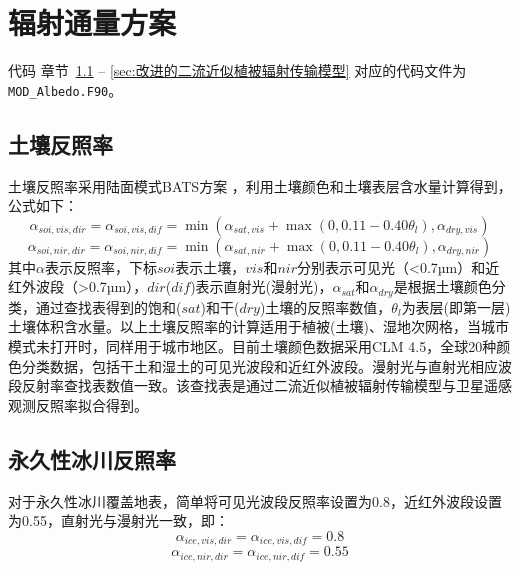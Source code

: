 \chapter{辐射通量方案}

\begin{mymdframed}{代码}
章节~\ref{sec:土壤反照率} -- \ref{sec:改进的二流近似植被辐射传输模型} 对应的代码文件为\texttt{MOD\_Albedo.F90}。
\end{mymdframed}


\section{土壤反照率}\label{sec:土壤反照率}
土壤反照率采用陆面模式BATS方案 \citep{dickinson1986biosphere,dickinson1993biosphere}，利用土壤颜色和土壤表层含水量计算得到，公式如下：
\begin{equation}\label{eq:soil_albedo1}
\alpha_{soi,vis,dir}=\alpha_{soi,vis,dif}=\min\left(\alpha_{sat, vis}+\max\left(0,0.11-0.40 \theta_{l}\right), \alpha_{dry, vis}\right)
\end{equation}
%
\begin{equation}
\alpha_{soi,nir,dir}=\alpha_{soi,nir,dif}=\min\left(\alpha_{sat, nir}+\max\left(0,0.11-0.40 \theta_{l}\right), \alpha_{dry, nir}\right)
\end{equation}
其中$\alpha$表示反照率，下标$soi$表示土壤，$vis$和$nir$分别表示可见光（<0.7µm）和近红外波段（>0.7µm），$dir$($dif$)表示直射光(漫射光)，$\alpha_{sat}$和$\alpha_{dry}$是根据土壤颜色分类，通过查找表得到的饱和($sat$)和干($dry$)土壤的反照率数值，$\theta_{l}$为表层(即第一层)土壤体积含水量。以上土壤反照率的计算适用于植被(土壤)、湿地次网格，当城市模式未打开时，同样用于城市地区。目前土壤颜色数据采用CLM 4.5，全球20种颜色分类数据，包括干土和湿土的可见光波段和近红外波段。漫射光与直射光相应波段反射率查找表数值一致。该查找表是\citet{lawrence2007representing}通过二流近似植被辐射传输模型与卫星遥感观测反照率拟合得到。


\section{永久性冰川反照率}\label{sec:永久性冰川反照率}
对于永久性冰川覆盖地表，简单将可见光波段反照率设置为0.8，近红外波段设置为0.55，直射光与漫射光一致，即：
\begin{equation}
\alpha_{ice,vis,dir}=\alpha_{ice,vis,dif}=0.8
\end{equation}
%
\begin{equation}
\alpha_{ice,nir,dir}=\alpha_{ice,nir,dif}=0.55
\end{equation}

